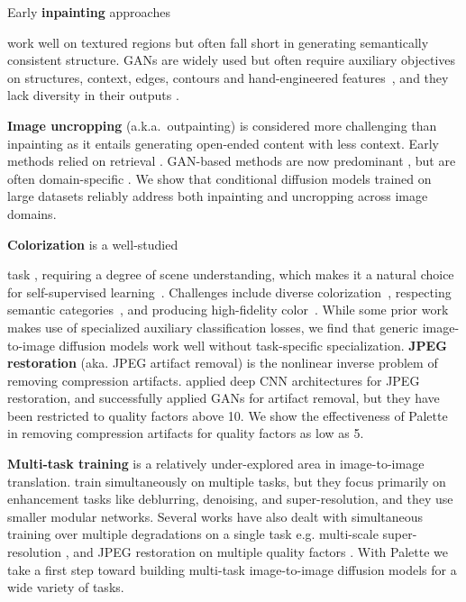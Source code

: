 Early \textbf{inpainting} approaches 

\cite{bertalmio2000image, barnes2009PAR, he2012statistics,hays2007scene}

work well on textured regions but often fall short in generating semantically consistent structure. GANs are widely used but often require auxiliary objectives on structures, context, edges, contours and hand-engineered features~\cite{iizuka2017globally, yu2018generative, yu2019free,nazeri2019edgeconnect, yi2020contextual, liu2020rethinking, kim2021zoomtoinpaint}, and they lack diversity in their outputs  \citep{zheng2019pluralistic, zhao2021large}.

\textbf{Image uncropping} (a.k.a.\ outpainting) is considered more challenging than inpainting as it entails generating open-ended content with less context. Early methods relied on retrieval \citep{kopf2012quality, wang2014biggerpicture, shan2014uncrop}. GAN-based methods are now predominant  \cite{teterwak2019boundless}, but are often domain-specific \cite{yang2019very, bowen2021oconet,wang2019srn, cheng2021out, lin2021infinitygan}. We show that conditional diffusion models trained on large  datasets reliably address both inpainting and uncropping across image domains.

{\bf Colorization} is a well-studied

task \cite{coltran,guadarrama2017pixcolor,royer-arxiv-2017,ardizzone-arxiv-2017}, requiring a degree of scene understanding, which makes it a natural choice for self-supervised learning~\citep{larsson2016learning}. Challenges include diverse colorization~\citep{deshpande2017learning}, respecting semantic categories~\citep{zhang2016colorful}, and producing high-fidelity color~\cite{guadarrama2017pixcolor}. While some prior work makes use of specialized auxiliary classification losses, we find that generic image-to-image diffusion models work well  without task-specific specialization.
\textbf{JPEG restoration} (aka. JPEG artifact removal) is the nonlinear inverse problem of removing compression artifacts. \cite{dong2015compression} applied deep CNN architectures for JPEG restoration, and \cite{galteri2017deep, galteri2019deep} successfully applied GANs  for artifact removal, but they have been restricted to quality factors above 10. We show the effectiveness of Palette in removing compression artifacts for quality factors as low as 5. 

{\bf Multi-task training} is a relatively under-explored area in image-to-image translation.
\citep{guocheng2019trinity, yu2018crafting} train simultaneously on multiple  tasks, but they focus primarily on enhancement tasks like deblurring, denoising, and super-resolution, and they use smaller modular networks. Several works have also dealt with simultaneous training over multiple degradations on a single task e.g. multi-scale super-resolution \citep{kim2016deeply}, and JPEG restoration on multiple quality factors \citep{galteri2019deep, liu2018multi}. With Palette we take a first step toward building multi-task image-to-image diffusion models for a wide variety of tasks.

